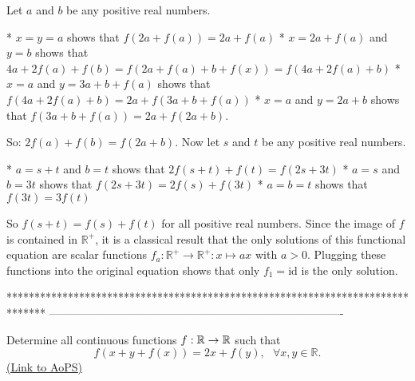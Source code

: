 


\begin{solution}
	Let $a$ and $b$ be any positive real numbers. 

* $x = y = a$ shows that $f(2a+f(a)) = 2a+f(a)$
* $x = 2a+f(a)$ and $y = b$ shows that $4a+2f(a)+f(b) = f(2a+f(a)+b+f(x)) = f(4a+2f(a)+b)$
* $x = a$ and $y = 3a+b+f(a)$ shows that $f(4a+2f(a)+b) = 2a+f(3a+b+f(a))$
* $x = a$ and $y = 2a+b$ shows that $f(3a+b+f(a)) = 2a+f(2a+b)$.

So: $2f(a)+f(b) = f(2a+b)$. Now let $s$ and $t$ be any positive real numbers. 

* $a = s+t$ and $b = t$ shows that $2f(s+t)+f(t) = f(2s+3t)$
* $a = s$ and $b = 3t$ shows that $f(2s+3t) = 2f(s)+f(3t)$
* $a = b = t$ shows that $f(3t) = 3f(t)$

So $f(s+t) = f(s)+f(t)$ for all positive real numbers. Since the image of $f$ is contained in $\mathbb{R}^+$, it is a classical result that the only solutions of this functional equation are scalar functions $f_a:\mathbb{R}^+\to\mathbb{R}^+:x\mapsto ax$ with $a>0$. Plugging these functions into the original equation shows that only $f_1 = \text{id}$ is the only solution.
\end{solution}
*******************************************************************************
-------------------------------------------------------------------------------

\begin{problem}
	Determine all continuous  functions $f: \Bbb{R} \to \Bbb{R}$ such that \[\displaystyle{\displaystyle{  f(x+y+f(x))=2x+f(y)  , \ \ \ \forall x,y \in  \mathbb{R}. }}\]
	\flushright \href{https://artofproblemsolving.com/community/c6h609495}{(Link to AoPS)}
\end{problem}



